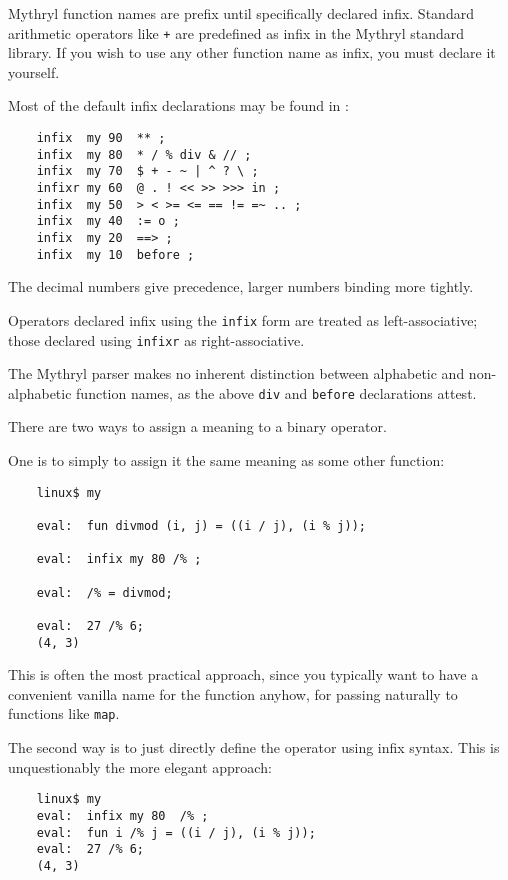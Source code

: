 Mythryl function names are prefix until specifically declared infix.  Standard 
arithmetic operators like {\tt +} are predefined as infix in the Mythryl standard 
library.  If you wish to use any other function name as infix, you must declare it 
yourself.

Most of the default infix declarations may be found in 
:
\begin{verbatim}
    infix  my 90  ** ;
    infix  my 80  * / % div & // ;
    infix  my 70  $ + - ~ | ^ ? \ ;
    infixr my 60  @ . ! << >> >>> in ;
    infix  my 50  > < >= <= == != =~ .. ;
    infix  my 40  := o ;
    infix  my 20  ==> ;
    infix  my 10  before ;
\end{verbatim}

The decimal numbers give precedence, larger numbers binding more tightly.

Operators declared infix using the {\tt infix} form are treated as 
left-associative;  those declared using {\tt infixr} as right-associative.

The Mythryl parser makes no inherent distinction between alphabetic and 
non-alphabetic function names, as the above {\tt div} and {\tt before} 
declarations attest.

There are two ways to assign a meaning to a binary operator.

One is to simply to assign it the same meaning as some other function:

\begin{verbatim}
    linux$ my

    eval:  fun divmod (i, j) = ((i / j), (i % j));

    eval:  infix my 80 /% ;

    eval:  /% = divmod;

    eval:  27 /% 6;
    (4, 3)
\end{verbatim}

This is often the most practical approach, since you typically want 
to have a convenient vanilla name for the function anyhow, for 
passing naturally to functions like {\tt map}.

The second way is to just directly define the operator 
using infix syntax.  This is unquestionably the more elegant approach:

\begin{verbatim}
    linux$ my
    eval:  infix my 80  /% ;
    eval:  fun i /% j = ((i / j), (i % j));
    eval:  27 /% 6;
    (4, 3)
\end{verbatim}



